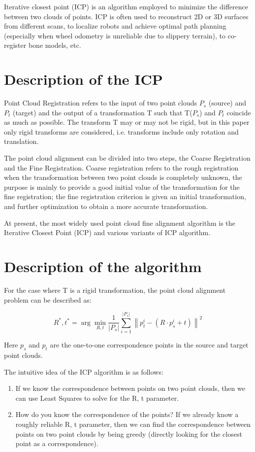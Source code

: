 \documentclass{article}
\begin{document}
	Iterative closest point (ICP) is an algorithm employed to minimize the difference between two clouds of points. ICP is often used to reconstruct 2D or 3D surfaces from different scans, to localize robots and achieve optimal path planning (especially when wheel odometry is unreliable due to slippery terrain), to co-register bone models, etc.
	\section{Description of the ICP}
	Point Cloud Registration refers to the input of two point clouds $P_s$ (source) and $P_t$ (target) and the output of a transformation T such that T($P_s$) and $P_t$ coincide as much as possible. The transform T may or may not be rigid, but in this paper only rigid transforms are considered, i.e. transforms include only rotation and translation.
	
	The point cloud alignment can be divided into two steps, the Coarse Registration and the Fine Registration. Coarse registration refers to the rough registration when the transformation between two point clouds is completely unknown, the purpose is mainly to provide a good initial value of the transformation for the fine registration; the fine registration criterion is given an initial transformation, and further optimization to obtain a more accurate transformation.
	
	At present, the most widely used point cloud fine alignment algorithm is the Iterative Closest Point (ICP) and various variants of ICP algorithm.
	
	\section{Description of the algorithm}
	For the case where T is a rigid transformation, the point cloud alignment problem can be described as:
	
	\begin{equation}
		R^{*}, t^{*}=\arg \min _{R, t}  \frac{1}{\left|P_{s}\right|} \sum_{i=1}^{\mid P_{s}|}\left\|p_{t}^{i}-\left(R \cdot p_{s}^{i}+t\right)\right\|^{2}
	\end{equation}
	
	Here $p_s$ and $p_t$ are the one-to-one correspondence points in the source and target point clouds.
	
	The intuitive idea of the ICP algorithm is as follows:
	\begin{enumerate}
		\item If we know the correspondence between points on two point clouds, then we can use Least Squares to solve for the R, t parameter.
		\item How do you know the correspondence of the points? If we already know a roughly reliable R, t parameter, then we can find the correspondence between points on two point clouds by being greedy (directly looking for the closest point as a correspondence).
	\end{enumerate}
	
\end{document}
